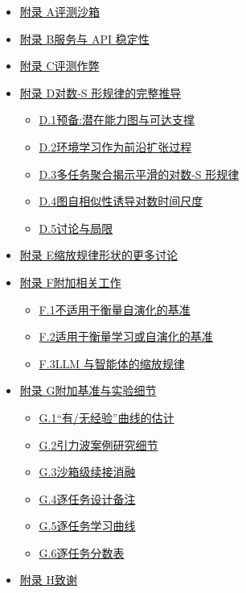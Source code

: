 \begin{itemize}[leftmargin=2em]
    \item \hyperref[app:harness]{附录 A\quad 评测沙箱}
    \item \hyperref[app:serving]{附录 B\quad 服务与 API 稳定性}
    \item \hyperref[app:hacking]{附录 C\quad 评测作弊}
    \item \hyperref[app:theory]{附录 D\quad 对数-S 形规律的完整推导}
    \begin{itemize}
        \item \hyperref[app:prelim]{D.1\quad 预备:潜在能力图与可达支撑}
        \item \hyperref[app:frontier]{D.2\quad 环境学习作为前沿扩张过程}
        \item \hyperref[app:aggregation]{D.3\quad 多任务聚合揭示平滑的对数-S 形规律}
        \item \hyperref[app:selfsim]{D.4\quad 图自相似性诱导对数时间尺度}
        \item \hyperref[app:limit]{D.5\quad 讨论与局限}
    \end{itemize}
    \item \hyperref[app:shapes]{附录 E\quad 缩放规律形状的更多讨论}
    \item \hyperref[app:related]{附录 F\quad 附加相关工作}
    \begin{itemize}
        \item \hyperref[app:related-nosel]{F.1\quad 不适用于衡量自演化的基准}
        \item \hyperref[app:related-sel]{F.2\quad 适用于衡量学习或自演化的基准}
        \item \hyperref[app:related-scaling]{F.3\quad LLM 与智能体的缩放规律}
    \end{itemize}
    \item \hyperref[app:extras]{附录 G\quad 附加基准与实验细节}
    \begin{itemize}
        \item \hyperref[app:exp-curves]{G.1\quad ``有/无经验''曲线的估计}
        \item \hyperref[app:case-study]{G.2\quad 引力波案例研究细节}
        \item \hyperref[app:harness-abl]{G.3\quad 沙箱级续接消融}
        \item \hyperref[app:per-task-notes]{G.4\quad 逐任务设计备注}
        \item \hyperref[app:per-task-curves]{G.5\quad 逐任务学习曲线}
        \item \hyperref[app:score-tables]{G.6\quad 逐任务分数表}
    \end{itemize}
    \item \hyperref[app:ack]{附录 H\quad 致谢}
\end{itemize}

